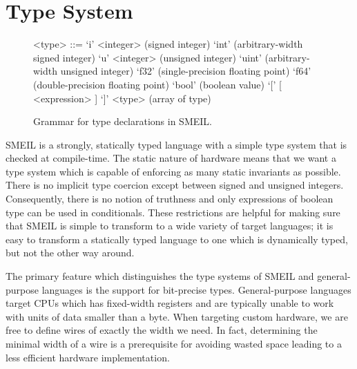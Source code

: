 
\section{Type System}
\label{sec:typesys}

\begin{figure}
\begin{grammar}
  <type> ::= `i' <integer> (signed integer)
  \alt `int' (arbitrary-width signed integer)
  \alt `u' <integer> (unsigned integer)
  \alt `uint' (arbitrary-width unsigned integer)
  \alt `f32' (single-precision floating point)
  \alt `f64' (double-precision floating point)
  \alt `bool' (boolean value)
  \alt `[' [ <expression> ] `]' <type> (array of type)
\end{grammar}
\caption{Grammar for type declarations in SMEIL.}
\label{fig:smeilgrm}
\end{figure}

SMEIL is a strongly, statically typed language with a simple type system that is
checked at compile-time. The static nature of hardware means that we want a
type system which is capable of enforcing as many static invariants as
possible. There is no implicit type coercion except between signed and unsigned
integers.
Consequently, there is no notion of truthness and only expressions of
boolean type can be used in conditionals. These restrictions are helpful for
making sure that SMEIL is simple to transform to a wide variety of target
languages; it is easy to transform a statically typed language to one which is
dynamically typed, but not the other way around.

The primary feature which distinguishes the type systems of SMEIL and
general-purpose languages is the support for bit-precise types. General-purpose
languages target CPUs which has fixed-width registers and are typically unable
to work with units of data smaller than a byte. When targeting custom hardware,
we are free to define wires of exactly the width we need. In fact, determining
the minimal width of a wire is a prerequisite for avoiding wasted space leading
to a less efficient hardware implementation.

